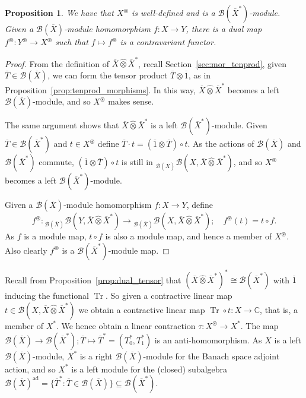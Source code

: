 \documentclass[a4paper,11pt]{article}
\theoremstyle{plain}
\newtheorem{proposition}{Proposition}[section]
\theoremstyle{remark}
\newcommand{\mc}[1]{\mathcal{#1}}
\newcommand{\proten}{\widehat\otimes}
\newcommand{\intdual}{\circledast}
\newcommand{\tr}{\operatorname{Tr}}
\newcommand{\ad}{{\operatorname{ad}}}
\begin{document}
\begin{proposition}
We have that $X^\intdual$ is well-defined and is a $\mc B(\overline X^*)$-module.  Given a $\mc B(\overline X)$-module homomorphism $f \colon X \to Y$, there is a dual map $f^\intdual \colon Y^\intdual \to X^\intdual$ such that $f\mapsto f^\intdual$ is a contravariant functor.
\end{proposition}
\begin{proof}
From the definition of $\overline X \proten \overline X^*$, recall Section~\ref{sec:mor_tenprod}, given $\overline T \in \mc B(\overline X)$, we can form the tensor product $\overline T \otimes \overline{1}$, as in Proposition~\ref{prop:tenprod_morphisms}.  In this way, $\overline X \proten \overline X^*$ becomes a left $\mc B(\overline X)$-module, and so $X^\intdual$ makes sense.

The same argument shows that $\overline X \proten \overline X^*$ is a left $\mc B(\overline X^*)$-module.  Given $\overline T\in\mc B(\overline X^*)$ and $t\in X^\intdual$ define $\overline T \cdot t = (\overline 1\otimes\overline T)\circ t$.  As the actions of $\mc B(\overline X)$ and $\mc B(\overline X^*)$ commute, $(\overline 1\otimes\overline T)\circ t$ is still in ${}_{\mc B(\overline X)}\mc B(X, \overline X \proten \overline X^*)$, and so $X^\intdual$ becomes a left $\mc B(\overline X^*)$-module.

Given a $\mc B(\overline X)$-module homomorphism $f \colon X \to Y$, define
\[ f^\intdual \colon {}_{\mc B(\overline X)}\mc B(Y, \overline X \proten \overline X^*) \to {}_{\mc B(\overline X)}\mc B(X, \overline X \proten \overline X^*); \quad
f^\intdual(t) = t \circ f. \]
As $f$ is a module map, $t\circ f$ is also a module map, and hence a member of $X^\intdual$.  Also clearly $f^\intdual$ is a $\mc B(\overline X^*)$-module map.
\end{proof}

Recall from Proposition~\ref{prop:dual_tensor} that $(\overline X \proten \overline X^*)^* \cong \mc B(\overline X^*)$ with $\overline 1$ inducing the functional $\tr$.  So given a contractive linear map $t\in\mc B(X, \overline X \proten \overline X^*)$ we obtain a contractive linear map $\tr\circ t \colon X \to \mathbb C$, that is, a member of $X^*$.
We hence obtain a linear contraction $\tau \colon X^\intdual \to X^*$.  The map $\mc B(\overline X) \to \mc B(\overline X^*); \overline T\mapsto \overline T^*=(T_0^*, T_1^*)$ is an anti-homomorphism.  As $X$ is a left $\mc B(\overline X)$-module, $X^*$ is a right $\mc B(\overline X)$-module for the Banach space adjoint action, and so $X^*$ is a left module for the (closed) subalgebra $\mc B(\overline X)^\ad = \{ \overline T^* : \overline T \in \mc B(\overline X) \} \subseteq \mc B(\overline X^*)$.  %
\end{document}
